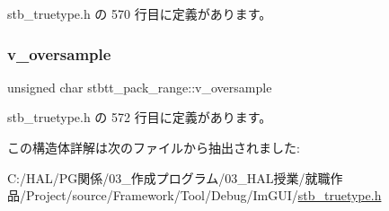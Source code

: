  stb\+\_\+truetype.\+h の 570 行目に定義があります。

\mbox{\label{structstbtt__pack__range_a6288f14006e257544db3d015c32b4113}} 
\subsubsection{\texorpdfstring{v\+\_\+oversample}{v\_oversample}}
{\footnotesize\ttfamily unsigned char stbtt\+\_\+pack\+\_\+range\+::v\+\_\+oversample}



 stb\+\_\+truetype.\+h の 572 行目に定義があります。



この構造体詳解は次のファイルから抽出されました\+:\begin{DoxyCompactItemize}
\item 
C\+:/\+H\+A\+L/\+P\+G関係/03\+\_\+作成プログラム/03\+\_\+\+H\+A\+L授業/就職作品/\+Project/source/\+Framework/\+Tool/\+Debug/\+Im\+G\+U\+I/\mbox{\hyperlink{stb__truetype_8h}{stb\+\_\+truetype.\+h}}\end{DoxyCompactItemize}
